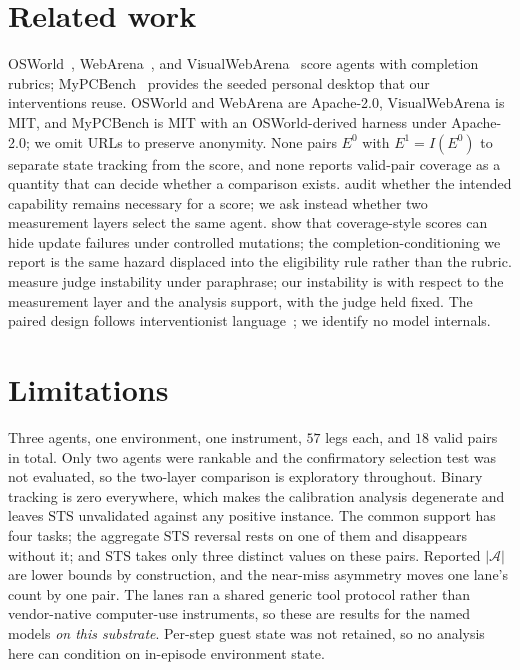\documentclass{article}
\newcommand{\A}{\mathcal{A}}
\newcommand{\STS}{\mathrm{STS}}
\begin{document}
\section{Related work}

OSWorld~\citep{xie2024osworld}, WebArena~\citep{zhou2024webarena}, and VisualWebArena~\citep{koh2024visualwebarena} score agents with completion rubrics; MyPCBench~\citep{jang2026mypcbench} provides the seeded personal desktop that our interventions reuse.
OSWorld and WebArena are Apache-2.0, VisualWebArena is MIT, and MyPCBench is MIT with an OSWorld-derived harness under Apache-2.0; we omit URLs to preserve anonymity.
None pairs $E^{0}$ with $E^{1}=I(E^{0})$ to separate state tracking from the score, and none reports valid-pair coverage as a quantity that can decide whether a comparison exists.
\citet{shao2026protocolvalidity} audit whether the intended capability remains necessary for a score; we ask instead whether two measurement layers select the same agent.
\citet{turk2026counterfactualclinical} show that coverage-style scores can hide update failures under controlled mutations; the completion-conditioning we report is the same hazard displaced into the eligibility rule rather than the rubric.
\citet{bellibatlu2026judgesense} measure judge instability under paraphrase; our instability is with respect to the measurement layer and the analysis support, with the judge held fixed.
The paired design follows interventionist language~\citep{pearl2009causality}; we identify no model internals.

\section{Limitations}

Three agents, one environment, one instrument, $57$ legs each, and $18$ valid pairs in total.
Only two agents were rankable and the confirmatory selection test was not evaluated, so the two-layer comparison is exploratory throughout.
Binary tracking is zero everywhere, which makes the calibration analysis degenerate and leaves $\STS$ unvalidated against any positive instance.
The common support has four tasks; the aggregate $\STS$ reversal rests on one of them and disappears without it; and $\STS$ takes only three distinct values on these pairs.
Reported $|\A|$ are lower bounds by construction, and the near-miss asymmetry moves one lane's count by one pair.
The lanes ran a shared generic tool protocol rather than vendor-native computer-use instruments, so these are results for the named models \emph{on this substrate}.
Per-step guest state was not retained, so no analysis here can condition on in-episode environment state.
\end{document}
